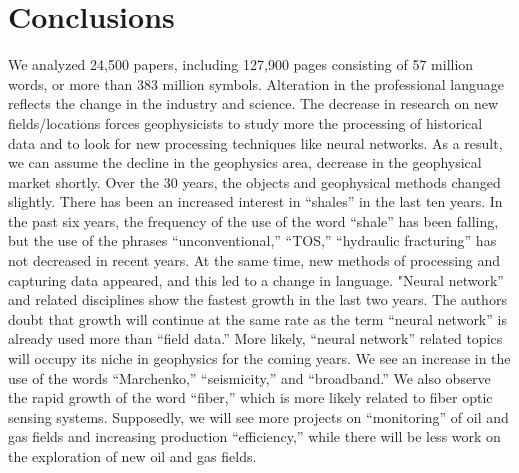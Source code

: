 \documentclass[geosciences,article,submit,moreauthors,pdftex]{Definitions/mdpi}
\begin{document}
\section{Conclusions}

We analyzed 24,500 papers, including 127,900 pages consisting of 57 million words, or more than 383 million symbols. Alteration in the professional language reflects the change in the industry and science. The decrease in research on new fields/locations forces geophysicists to study more the processing of historical data and to look for new processing techniques like neural networks. As a result, we can assume the decline in the geophysics area, decrease in the geophysical market shortly. Over the 30 years, the objects and geophysical methods changed slightly. There has been an increased interest in ``shales'' in the last ten years. In the past six years, the frequency of the use of the word ``shale'' has been falling, but the use of the phrases ``unconventional,'' ``TOS,'' ``hydraulic fracturing'' has not decreased in recent years. At the same time, new methods of processing and capturing data appeared, and this led to a change in language. "Neural network'' and related disciplines show the fastest growth in the last two years. The authors doubt that growth will continue at the same rate as the term ``neural network'' is already used more than ``field data.'' More likely, ``neural network'' related topics will occupy its niche in geophysics for the coming years. We see an increase in the use of the words ``Marchenko,'' ``seismicity,'' and ``broadband.'' We also observe the rapid growth of the word ``fiber,'' which is more likely related to fiber optic sensing systems. Supposedly, we will see more projects on ``monitoring'' of oil and gas fields and increasing production ``efficiency,'' while there will be less work on the exploration of new oil and gas fields. 
 

\vspace{6pt} 
\end{document}
